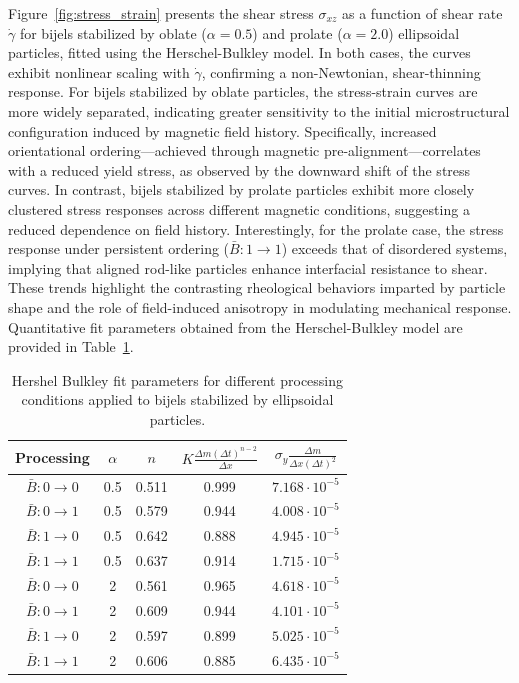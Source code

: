 Figure~\ref{fig:stress_strain} presents the shear stress $\sigma_{xz}$ as a function of shear rate $\dot{\gamma}$ for bijels stabilized by oblate ($\alpha = 0.5$) 
and prolate ($\alpha = 2.0$) ellipsoidal particles, fitted using the Herschel-Bulkley model. In both cases, the curves exhibit nonlinear scaling with $\dot{\gamma}$, 
confirming a non-Newtonian, shear-thinning response. For bijels stabilized by oblate particles, the stress-strain curves are more widely separated, indicating 
greater sensitivity to the initial microstructural configuration induced by magnetic field history. Specifically, increased orientational ordering—achieved through 
magnetic pre-alignment—correlates with a reduced yield stress, as observed by the downward shift of the stress curves. In contrast, bijels stabilized by prolate 
particles exhibit more closely clustered stress responses across different magnetic conditions, suggesting a reduced dependence on field history. Interestingly, 
for the prolate case, the stress response under persistent ordering ($\bar{B}:1 \rightarrow 1$) exceeds that of disordered systems, implying that aligned rod-like 
particles enhance interfacial resistance to shear. These trends highlight the contrasting rheological behaviors imparted by particle shape and the role of 
field-induced anisotropy in modulating mechanical response. Quantitative fit parameters obtained from the Herschel-Bulkley model are provided in 
Table~\ref{table:rheology_fit}.

\begin{table}[h!]
    \centering
    \renewcommand{\arraystretch}{1.5}  %
    \begin{tabular}{||c c c c c||} 
     \hline
     Processing & $\alpha$ & $n$ & $K \frac{\Delta m (\Delta t)^{n-2}}{\Delta x} $ & $\sigma_{y} \frac{\Delta m}{\Delta x (\Delta t)^2}$ \\ [0.5ex] 
     \hline\hline
     $\bar{B}: 0 \rightarrow 0$ & 0.5 & 0.511 & 0.999 & $7.168 \cdot 10^{-5}$ \\ 
     \hline
     $\bar{B}: 0 \rightarrow 1$ & 0.5 & 0.579 & 0.944 & $4.008 \cdot 10^{-5}$ \\
     \hline
     $\bar{B}: 1 \rightarrow 0$ & 0.5 & 0.642 & 0.888 & $4.945 \cdot 10^{-5}$ \\
     \hline
     $\bar{B}: 1 \rightarrow 1$ & 0.5 & 0.637 & 0.914 & $1.715 \cdot 10^{-5}$ \\
     \hline
     $\bar{B}: 0 \rightarrow 0$ & 2 & 0.561 & 0.965 & $4.618 \cdot 10^{-5}$ \\
     \hline
     $\bar{B}: 0 \rightarrow 1$ & 2 & 0.609 & 0.944 & $4.101 \cdot 10^{-5}$ \\
     \hline
     $\bar{B}: 1 \rightarrow 0$ & 2 & 0.597 & 0.899 & $5.025 \cdot 10^{-5}$ \\
     \hline
     $\bar{B}: 1 \rightarrow 1$ & 2 & 0.606 & 0.885 & $6.435 \cdot 10^{-5}$ \\ [1ex] 
     \hline
    \end{tabular}
    \caption{Hershel Bulkley fit parameters for different processing conditions applied to bijels stabilized by ellipsoidal particles.}
    \label{table:rheology_fit}
\end{table}
 
